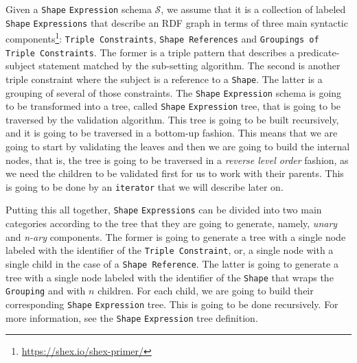 Given a \texttt{Shape} \texttt{Expression} schema $\mathcal{S}$, we assume that it is a collection of labeled \texttt{Shape} \texttt{Expressions} that describe an RDF graph in terms of three main syntactic components\footnote{\url{https://shex.io/shex-primer/}}: \texttt{Triple Constraints}, \texttt{Shape References} and \texttt{Groupings of Triple Constraints}. The former is a triple pattern that describes a predicate-subject statement matched by the sub-setting algorithm. The second is another triple constraint where the subject is a reference to a \texttt{Shape}. The latter is a grouping of several of those constraints. The \texttt{Shape} \texttt{Expression} schema is going to be transformed into a tree, called \texttt{Shape} \texttt{Expression} tree, that is going to be traversed by the validation algorithm. This tree is going to be built recursively, and it is going to be traversed in a bottom-up fashion. This means that we are going to start by validating the leaves and then we are going to build the internal nodes, that is, the tree is going to be traversed in a \textit{reverse level order} fashion, as we need the children to be validated first for us to work with their parents. This is going to be done by an \texttt{iterator} that we will describe later on.

Putting this all together, \texttt{Shape} \texttt{Expressions} can be divided into two main categories according to the tree that they are going to generate, namely, \textit{unary} and \textit{n-ary} components. The former is going to generate a tree with a single node labeled with the identifier of the \texttt{Triple Constraint}, or, a single node with a single child in the case of a \texttt{Shape Reference}. The latter is going to generate a tree with a single node labeled with the identifier of the \texttt{Shape} that wraps the \texttt{Grouping} and with $n$ children. For each child, we are going to build their corresponding \texttt{Shape} \texttt{Expression} tree. This is going to be done recursively. For more information, see the \texttt{Shape} \texttt{Expression} tree definition.

